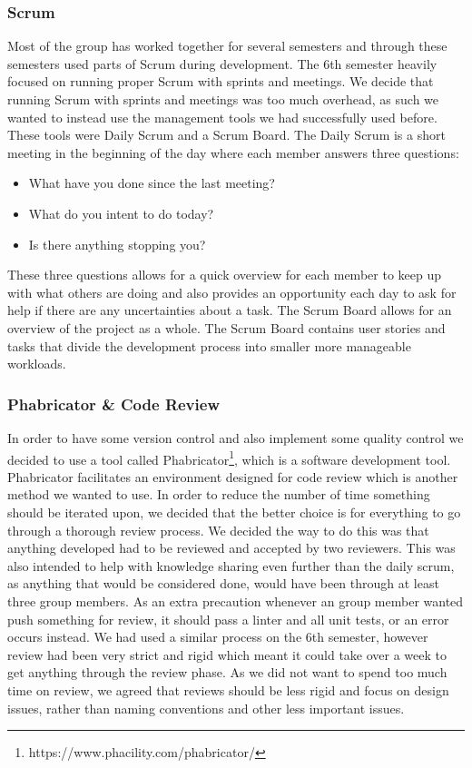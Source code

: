 \subsubsection{Scrum}
Most of the group has worked together for several semesters and through these semesters used parts of Scrum during development.
The 6th semester heavily focused on running proper Scrum with sprints and meetings.
We decide that running Scrum with sprints and meetings was too much overhead, as such we wanted to instead use the management tools we had successfully used before.
These tools were Daily Scrum and a Scrum Board.
The Daily Scrum is a short meeting in the beginning of the day where each member answers three questions:
\begin{itemize}
    \item What have you done since the last meeting? 
    \item What do you intent to do today?
    \item Is there anything stopping you?
\end{itemize}
These three questions allows for a quick overview for each member to keep up with what others are doing and also provides an opportunity each day to ask for help if there are any uncertainties about a task.
The Scrum Board allows for an overview of the project as a whole.
The Scrum Board contains user stories and tasks that divide the development process into smaller more manageable workloads.
\subsubsection{Phabricator \& Code Review}
In order to have some version control and also implement some quality control we decided to use a tool called Phabricator\footnote{https://www.phacility.com/phabricator/}, which is a software development tool.
Phabricator facilitates an environment designed for code review which is another method we wanted to use.
In order to reduce the number of time something should be iterated upon, we decided that the better choice is for everything to go through a thorough review process.
We decided the way to do this was that anything developed had to be reviewed and accepted by two reviewers.
This was also intended to help with knowledge sharing even further than the daily scrum, as anything that would be considered done, would have been through at least three group members.
As an extra precaution whenever an group member wanted push something for review, it should pass a linter and all unit tests, or an error occurs instead.
We had used a similar process on the 6th semester, however review had been very strict and rigid which meant it could take over a week to get anything through the review phase.
As we did not want to spend too much time on review, we agreed that reviews should be less rigid and focus on design issues, rather than naming conventions and other less important issues.

